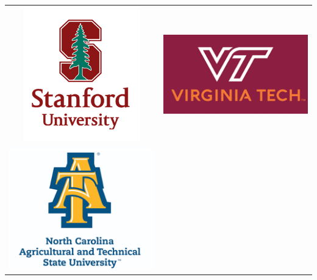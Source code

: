 \documentclass[landscape,paperwidth=70in,paperheight=46in,fontscale=0.225]{baposter} %
\begin{document}
\begin{poster}
{ 
\begin{tabular}{c c}
\includegraphics[scale=0.4]{logos/stanford.png} &
\includegraphics[scale=0.4]{logos/vt.png} \\
\includegraphics[scale=0.4]{logos/ncatnt.png} 
\end{tabular}
}

            

\vspace{-2.5in} %



\end{poster}
\end{document}
